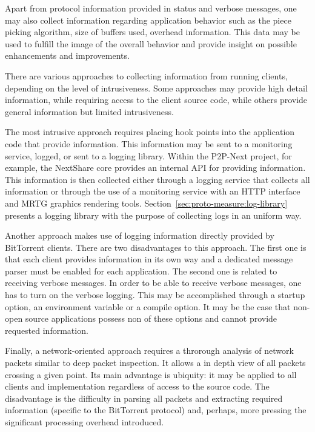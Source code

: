 Apart from protocol information provided in status and verbose messages, one
may also collect information regarding application behavior such as the piece
picking algorithm, size of buffers used, overhead information. This data may
be used to fulfill the image of the overall behavior and provide insight on
possible enhancements and improvements.

There are various approaches to collecting information from running clients,
depending on the level of intrusiveness. Some approaches may provide high
detail information, while requiring access to the client source code, while
others provide general information but limited intrusiveness.

The most intrusive approach requires placing hook points into the application
code that provide information. This information may be sent to a monitoring
service, logged, or sent to a logging library. Within the P2P-Next project,
for example, the NextShare core provides an internal API for providing
information. This information is then collected either through a logging
service that collects all information or through the use of a monitoring
service with an HTTP interface and MRTG graphics rendering tools.
Section~\ref{sec:proto-measure:log-library} presents a logging library with
the purpose of collecting logs in an uniform way.

Another approach makes use of logging information directly provided by
BitTorrent clients. There are two disadvantages to this approach. The first
one is that each client provides information in its own way and a dedicated
message parser must be enabled for each application. The second one is related
to receiving verbose messages. In order to be able to receive verbose
messages, one has to turn on the verbose logging. This may be accomplished
through a startup option, an environment variable or a compile option. It may
be the case that non-open source applications possess non of these options and
cannot provide requested information.

Finally, a network-oriented approach requires a throrough analysis of network
packets similar to deep packet inspection. It allows a in depth view of all
packets crossing a given point. Its main advantage is ubiquity: it may be
applied to all clients and implementation regardless of access to the source
code. The disadvantage is the difficulty in parsing all packets and extracting
required information (specific to the BitTorrent protocol) and, perhaps, more
pressing the significant processing overhead introduced.

